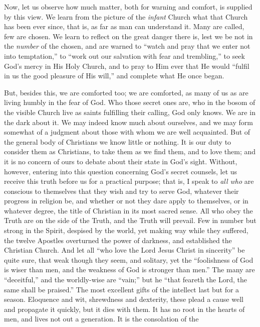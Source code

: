 Now, let us observe how much matter, both for warning
and comfort, is supplied by this view. We learn from the
picture of the \emph{infant} Church what that Church has
been ever since, that is, as far as man can understand
it. Many are called, few are chosen. We learn to reflect
on the great danger there is, lest we be not in the \emph{number}
of the chosen, and are warned to ``watch and pray
that we enter not into temptation,'' to ``work
out our salvation with fear and trembling,'' to seek
God's mercy in His Holy Church, and to pray to Him ever
that He would ``fulfil in us the good pleasure of His
will,'' and complete what He once began.

But, besides this, we are comforted too; we are
comforted, as many of us as are living humbly in the fear
of God. Who those secret ones are, who in the bosom of
the visible Church live as saints fulfilling their
calling, God only knows. We are in the dark about it. We
may indeed know much about ourselves, and we may form
somewhat of a judgment about those with whom we are well
acquainted. But of the general body of Christians we know
little or nothing. It is our duty to consider them as
Christians, to take them as we find them, and to love
them; and it is no concern of ours to debate about their
state in God's sight. Without, however, entering into
this question concerning God's secret counsels, let us
receive this truth before us for a practical purpose;
that is, I speak to \emph{all who} are conscious to
themselves that they wish and try to serve God, whatever
their progress in religion be, and whether or not they
dare apply to themselves, or in whatever degree, the
title of Christian in its most sacred sense. All who obey
the Truth are on the side of the Truth, and the Truth
will prevail. Few in number but strong in the Spirit,
despised by the world, yet making way while they
suffered, the twelve Apostles overturned the power of
darkness, and established the Christian Church. And let
all ``who love the Lord Jesus Christ in
sincerity'' be quite sure, that weak though they
seem, and solitary, yet the ``foolishness of God is
wiser than men, and the weakness of God is stronger than
men.'' The many are ``deceitful,'' and the
worldly-wise are ``vain;'' but he ``that
feareth the Lord, the same shall be praised.'' The
most excellent gifts of the intellect last but for a
season. Eloquence and wit, shrewdness and dexterity,
these plead a cause well and propagate it quickly, but it
dies with them. It has no root in the hearts of men, and
lives not out a generation. It is the consolation of the
